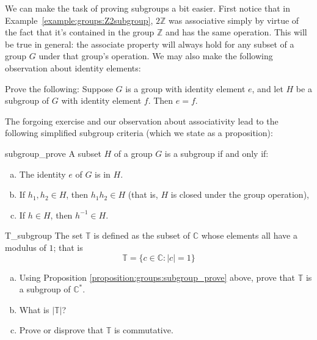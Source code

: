 We can make the task of proving subgroups  a bit easier. First notice that in Example~\ref{example:groups:Z2subgroup},  $2{\mathbb Z}$ was  associative simply by virtue of the fact that it's contained in the  group ${\mathbb Z}$ and has the same operation.  This will be true in general: the associate property will always hold for any subset of a group $G$ under that group's operation. We may also make the following observation about identity elements:

\begin{exercise}{65}
Prove the following: Suppose $G$ is a group with identity element $e$, and let $H$ be a subgroup of $G$ with identity element $f$.  Then $e=f$.
\end{exercise}

The forgoing exercise and our observation about associativity lead to the following simplified subgroup criteria (which we state as a proposition):

\begin{prop}{subgroup_prove}
A subset $H$ of a group $G$ is a subgroup if and only if: 
\begin{enumerate}[(a)]
 
 \item
The identity $e$ of $G$ is in $H$. 
 
\item
If $h_1, h_2 \in H$, then $h_1h_2 \in H$ (that is, $H$ is closed under the group operation), 
 
\item
If $h \in H$, then $h^{-1} \in H$.
 
\end{enumerate}
\end{prop}
 
\begin{exercise}{T_subgroup}
The set ${\mathbb T}$ is defined as the subset of  ${\mathbb C}$ whose elements all have a modulus of $1$; that is
\[
{\mathbb T} = \{c \in {\mathbb C} :  | c | =1 \} \]

\begin{enumerate}[(a)]
\item
Using Proposition \ref{proposition:groups:subgroup_prove} above, prove that ${\mathbb T}$ is a subgroup of ${\mathbb C}^{\ast}$.
\item
What is $| {\mathbb T} |$?
\item
Prove or disprove that ${\mathbb T}$ is commutative.
\end{enumerate}
\end{exercise}

